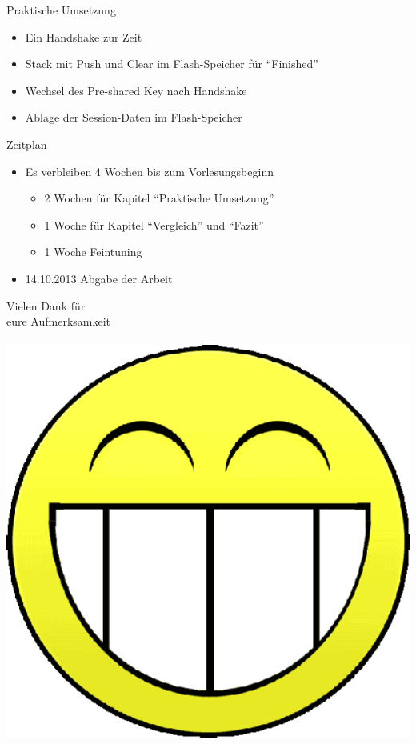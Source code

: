 \documentclass{beamer}
\begin{document}
\begin{frame}{Praktische Umsetzung}
  \begin{itemize}
    \item Ein Handshake zur Zeit
    \item Stack mit Push und Clear im Flash-Speicher für "`Finished"'
    \item Wechsel des Pre-shared Key nach Handshake
    \item Ablage der Session-Daten im Flash-Speicher
  \end{itemize}
\end{frame}

\begin{frame}{Zeitplan}
  \begin{itemize}
    \item Es verbleiben 4 Wochen bis zum Vorlesungsbeginn
    \begin{itemize}
      \item 2 Wochen für Kapitel "`Praktische Umsetzung"'
      \item 1 Woche für Kapitel "`Vergleich"' und "`Fazit"'
      \item 1 Woche Feintuning
    \end{itemize}
    \item 14.10.2013 Abgabe der Arbeit
  \end{itemize}
\end{frame}

\begin{frame}{}
  \begin{center}
    \begin{LARGE}
      Vielen Dank für\\
      eure Aufmerksamkeit\\
      ~\\
      \includegraphics[scale=0.2]{pic/smilie.png}
    \end{LARGE}
  \end{center}
\end{frame}
\end{document}
